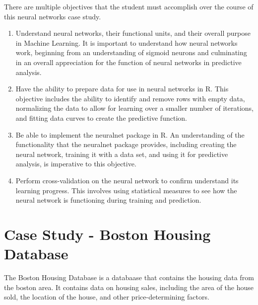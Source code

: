 There are multiple objectives that the student must accomplish over the course of this neural networks case study.
\begin{enumerate}
\item Understand neural networks, their functional units, and their overall purpose in Machine Learning.
It is important to understand how neural networks work, beginning from an understanding of sigmoid neurons and culminating in an overall appreciation for the function of neural networks in predictive analysis.
\item Have the ability to prepare data for use in neural networks in R.
This objective includes the ability to identify and remove rows with empty data, normalizing the data to allow for learning over a smaller number of iterations, and fitting data curves to create the predictive function.
\item Be able to implement the neuralnet package in R.
An understanding of the functionality that the neuralnet package provides, including creating the neural network, training it with a data set, and using it for predictive analysis, is imperative to this objective.
\item Perform cross-validation on the neural network to confirm understand its learning progress.
This involves using statistical measures to see how the neural network is functioning during training and prediction.
\end{enumerate}
\section{Case Study - Boston Housing Database}

The Boston Housing Database is a databaase that contains the housing data from the boston area.
It contains data on housing sales, including the area of the house sold, the location of the house, and other price-determining factors.

